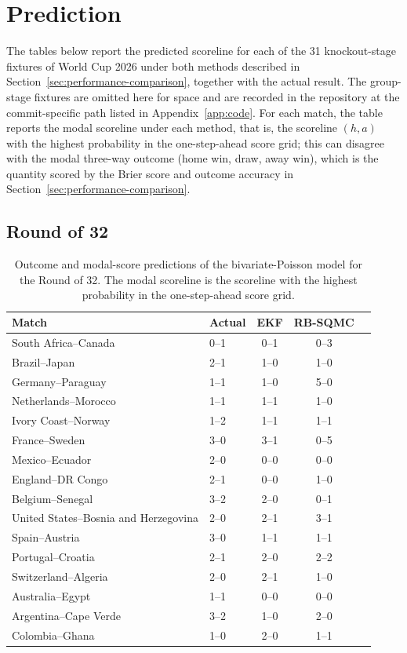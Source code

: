 \chapter{Prediction}
\label{app:prediction}

The tables below report the predicted scoreline for each of the 31 knockout-stage fixtures of World Cup 2026 under both methods described in Section~\ref{sec:performance-comparison}, together with the actual result. The group-stage fixtures are omitted here for space and are recorded in the repository at the commit-specific path listed in Appendix~\ref{app:code}. For each match, the table reports the modal scoreline under each method, that is, the scoreline $(h, a)$ with the highest probability in the one-step-ahead score grid; this can disagree with the modal three-way outcome (home win, draw, away win), which is the quantity scored by the Brier score and outcome accuracy in Section~\ref{sec:performance-comparison}.
\section{Round of 32}

\begin{table}[H]
\centering
\begin{tabular}{llccc}
\toprule
Match & Actual & EKF & RB-SQMC \\
\midrule
South Africa--Canada & 0--1 & 0--1 & 0--3 \\
Brazil--Japan & 2--1 & 1--0 & 1--0 \\
Germany--Paraguay & 1--1 & 1--0 & 5--0 \\
Netherlands--Morocco & 1--1 & 1--1 & 1--0 \\
Ivory Coast--Norway & 1--2 & 1--1 & 1--1 \\
France--Sweden & 3--0 & 3--1 & 0--5 \\
Mexico--Ecuador & 2--0 & 0--0 & 0--0 \\
England--DR Congo & 2--1 & 0--0 & 1--0 \\
Belgium--Senegal & 3--2 & 2--0 & 0--1 \\
United States--Bosnia and Herzegovina & 2--0 & 2--1 & 3--1 \\
Spain--Austria & 3--0 & 1--1 & 1--1 \\
Portugal--Croatia & 2--1 & 2--0 & 2--2 \\
Switzerland--Algeria & 2--0 & 2--1 & 1--0 \\
Australia--Egypt & 1--1 & 0--0 & 0--0 \\
Argentina--Cape Verde & 3--2 & 1--0 & 2--0 \\
Colombia--Ghana & 1--0 & 2--0 & 1--1 \\
\bottomrule
\end{tabular}
\caption{Outcome and modal-score predictions of the bivariate-Poisson model for the Round of 32. The modal scoreline is the scoreline with the highest probability in the one-step-ahead score grid.}
\end{table}

